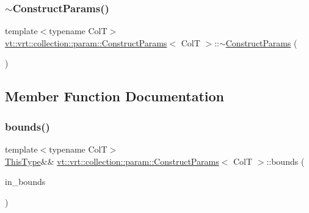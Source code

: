 \mbox{\label{structvt_1_1vrt_1_1collection_1_1param_1_1_construct_params_a554d80e7579966d403ab9ce3192cc917}} 
\subsubsection{\texorpdfstring{$\sim$\+Construct\+Params()}{~ConstructParams()}}
{\footnotesize\ttfamily template$<$typename ColT$>$ \\
\hyperlink{structvt_1_1vrt_1_1collection_1_1param_1_1_construct_params}{vt\+::vrt\+::collection\+::param\+::\+Construct\+Params}$<$ ColT $>$\+::$\sim$\hyperlink{structvt_1_1vrt_1_1collection_1_1param_1_1_construct_params}{Construct\+Params} (\begin{DoxyParamCaption}{ }\end{DoxyParamCaption})\hspace{0.3cm}{\ttfamily [inline]}}



\subsection{Member Function Documentation}
\mbox{\label{structvt_1_1vrt_1_1collection_1_1param_1_1_construct_params_a51f2e63f9685930f39c646886e778c32}} 
\subsubsection{\texorpdfstring{bounds()}{bounds()}}
{\footnotesize\ttfamily template$<$typename ColT$>$ \\
\hyperlink{structvt_1_1vrt_1_1collection_1_1param_1_1_construct_params_a13d4910c0f6825c7b0ddfebce5288bea}{This\+Type}\&\& \hyperlink{structvt_1_1vrt_1_1collection_1_1param_1_1_construct_params}{vt\+::vrt\+::collection\+::param\+::\+Construct\+Params}$<$ ColT $>$\+::bounds (\begin{DoxyParamCaption}\item[{\hyperlink{structvt_1_1vrt_1_1collection_1_1param_1_1_construct_params_a7bc8d5d57e377e0f2e60031582eeb7e6}{Index\+Type}}]{in\+\_\+bounds }\end{DoxyParamCaption})\hspace{0.3cm}{\ttfamily [inline]}}



